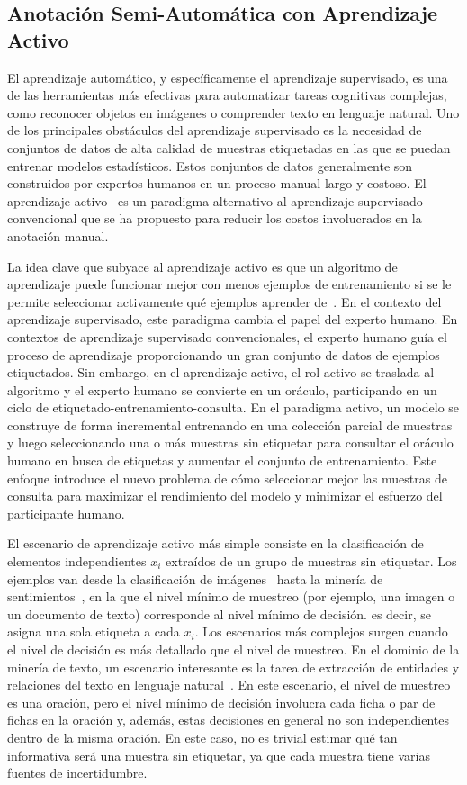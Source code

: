 \subsection{Anotación Semi-Automática con Aprendizaje Activo}

El aprendizaje automático, y específicamente el aprendizaje supervisado, es una de las herramientas más efectivas para automatizar tareas cognitivas complejas, como reconocer objetos en imágenes o comprender texto en lenguaje natural. Uno de los principales obstáculos del aprendizaje supervisado es la necesidad de conjuntos de datos de alta calidad de muestras etiquetadas en las que se puedan entrenar modelos estadísticos. Estos conjuntos de datos generalmente son construidos por expertos humanos en un proceso manual largo y costoso. El aprendizaje activo~\cite{Cohn2010ActiveL} es un paradigma alternativo al aprendizaje supervisado convencional que se ha propuesto para reducir los costos involucrados en la anotación manual.

La idea clave que subyace al aprendizaje activo es que un algoritmo de aprendizaje puede funcionar mejor con menos ejemplos de entrenamiento si se le permite seleccionar activamente qué ejemplos aprender de~\cite{seungquery}.
En el contexto del aprendizaje supervisado, este paradigma cambia el papel del experto humano.
En contextos de aprendizaje supervisado convencionales, el experto humano guía el proceso de aprendizaje proporcionando un gran conjunto de datos de ejemplos etiquetados. Sin embargo, en el aprendizaje activo, el rol activo se traslada al algoritmo y el experto humano se convierte en un oráculo, participando en un ciclo de etiquetado-entrenamiento-consulta.
En el paradigma activo, un modelo se construye de forma incremental entrenando en una colección parcial de muestras y luego seleccionando una o más muestras sin etiquetar para consultar el oráculo humano en busca de etiquetas y aumentar el conjunto de entrenamiento.
Este enfoque introduce el nuevo problema de cómo seleccionar mejor las muestras de consulta para maximizar el rendimiento del modelo y minimizar el esfuerzo del participante humano.

El escenario de aprendizaje activo más simple consiste en la clasificación de elementos independientes $ x_i $ extraídos de un grupo de muestras sin etiquetar.
Los ejemplos van desde la clasificación de imágenes~\cite{Gal2017DeepBA} hasta la minería de sentimientos~\cite{Kranjc2015ActiveLF}, en la que el nivel mínimo de muestreo (por ejemplo, una imagen o un documento de texto) corresponde al nivel mínimo de decisión. es decir, se asigna una sola etiqueta a cada $ x_i $. Los escenarios más complejos surgen cuando el nivel de decisión es más detallado que el nivel de muestreo. En el dominio de la minería de texto, un escenario interesante es la tarea de extracción de entidades y relaciones del texto en lenguaje natural~\cite{zhang2012unified}.
En este escenario, el nivel de muestreo es una oración, pero el nivel mínimo de decisión involucra cada ficha o par de fichas en la oración y, además, estas decisiones en general no son independientes dentro de la misma oración.
En este caso, no es trivial estimar qué tan informativa será una muestra sin etiquetar, ya que cada muestra tiene varias fuentes de incertidumbre.

